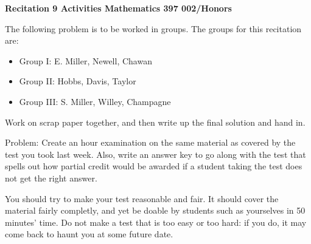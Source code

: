 
\sf
\begin{center}
{\bf Recitation 9 Activities  Mathematics 397 002/Honors }
\end{center}
\bigskip
The following  problem is to be worked in groups. The groups for
this recitation are: 
\begin{itemize}
\item Group I: E. Miller, Newell, Chawan
\item Group II: Hobbs, Davis, Taylor
\item Group III: S. Miller, Willey, Champagne 
\end{itemize}

Work on scrap paper together, and then write up the final solution  
and hand in. 
\par
\bigskip

Problem: Create an hour examination on the same material as covered by the
test you took last week. Also, write an answer key to go along with the
test that spells out how partial credit would be awarded if a student taking
the test does not get the right answer. 

\smallskip
You should try to make your test reasonable and fair. It should cover the
material fairly completly, and yet be doable by students such as yourselves
in 50 minutes' time.
Do not make a test that is
too easy or too hard: if you do, it may come back to haunt you at some
future date. 


